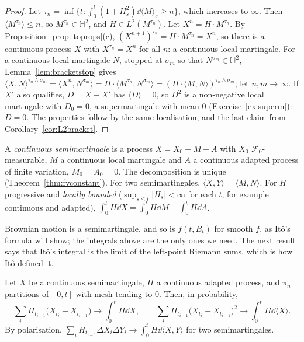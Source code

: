 \begin{proof}
Let $\tau_n=\inf\{t:\int_0^t(1+H_s^2)\dd\langle M\rangle_s\ge n\}$, which increases to $\infty$. Then $\langle M^{\tau_n}\rangle\le n$, so $M^{\tau_n}\in\mathbb H^2$, and $H\in L^2(M^{\tau_n})$. Let $X^n=H\cdot M^{\tau_n}$. By
Proposition~\ref{prop:itoprops}(c), $(X^{n+1})^{\tau_n}=H\cdot M^{\tau_n}=X^n$, so there is a continuous process $X$ with $X^{\tau_n}=X^n$ for all $n$: a continuous local martingale. For a continuous local martingale $N$,
stopped at $\sigma_m$ so that $N^{\sigma_m}\in\mathbb H^2$, Lemma~\ref{lem:bracketstop} gives $\langle X,N\rangle^{\tau_n\wedge\sigma_m}=\langle X^n,N^{\sigma_m}\rangle=H\cdot\langle M^{\tau_n},N^{\sigma_m}\rangle=(H\cdot\langle M,N\rangle)^{\tau_n\wedge\sigma_m}$;
let $n,m\to\infty$. If $X'$ also qualifies, $D=X-X'$ has $\langle D\rangle=0$, so $D^2$ is a non-negative local martingale with $D_0=0$, a supermartingale with mean $0$ (Exercise~\ref{ex:superm}): $D=0$. The
properties follow by the same localisation, and the last claim from Corollary~\ref{cor:L2bracket}.
\end{proof}

\begin{definition}\label{def:semimart}
A \emph{continuous semimartingale} is a process $X=X_0+M+A$ with $X_0$ $\mathcal F_0$-measurable, $M$ a continuous local martingale and $A$ a continuous adapted process of finite variation, $M_0=A_0=0$. The
decomposition is unique (Theorem~\ref{thm:fvconstant}). For two semimartingales, $\langle X,Y\rangle=\langle M,N\rangle$. For $H$ progressive and \emph{locally bounded} ($\sup_{s\le t}|H_s|<\infty$ for each $t$, for example
continuous and adapted), $\int_0^tH\dd X=\int_0^tH\dd M+\int_0^tH\dd A$.
\end{definition}

Brownian motion is a semimartingale, and so is $f(t,B_t)$ for smooth $f$, as It\^o's formula will show; the integrals above are the only ones we need. The next result says that It\^o's integral is the limit
of the left-point Riemann sums, which is how It\^o defined it.

\begin{proposition}\label{prop:riemann}
Let $X$ be a continuous semimartingale, $H$ a continuous adapted process, and $\pi_n$ partitions of $[0,t]$ with mesh tending to $0$. Then, in probability,
\[
\sum_iH_{t_{i-1}}\bigl(X_{t_i}-X_{t_{i-1}}\bigr)\longrightarrow\int_0^tH\dd X,\qquad\sum_iH_{t_{i-1}}\bigl(X_{t_i}-X_{t_{i-1}}\bigr)^2\longrightarrow\int_0^tH\dd\langle X\rangle .
\]
By polarisation, $\sum_iH_{t_{i-1}}\Delta X_i\Delta Y_i\to\int_0^tH\dd\langle X,Y\rangle$ for two semimartingales.
\end{proposition}

